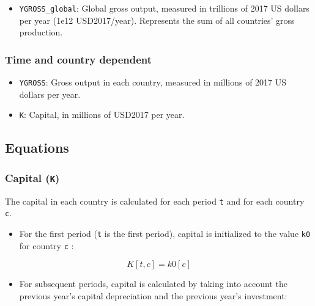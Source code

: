 \documentclass[
]{article}
\providecommand{\tightlist}{%
  \setlength{\itemsep}{0pt}\setlength{\parskip}{0pt}}
\begin{document}
\begin{itemize}
\tightlist
\item
  \texttt{YGROSS\_global}: Global gross output, measured in trillions of
  2017 US dollars per year (1e12 USD2017/year). Represents the sum of all countries'
  gross production.
\end{itemize}

\subsubsection{Time and country
dependent}\label{time-and-country-dependent-7}

\begin{itemize}
\item
  \texttt{YGROSS}: Gross output in each country, measured in millions of
  2017 US dollars per year.
\item
  \texttt{K}: Capital, in millions of USD2017 per year.
\end{itemize}

\subsection{Equations}\label{equations-3}

\subsubsection{\texorpdfstring{Capital
(\texttt{K})}{Capital (K)}}\label{capital-k}

The capital in each country is calculated for each period \texttt{t} and
for each country \texttt{c}.

\begin{itemize}
\tightlist
\item
  For the first period (\texttt{t} is the first period), capital is
  initialized to the value \texttt{k0} for country \texttt{c} :
\end{itemize}

\begin{equation}
 K[t,c] = k0[c]
\end{equation}


\begin{itemize}
\tightlist
\item
  For subsequent periods, capital is calculated by taking into account
  the previous year's capital depreciation and the previous year's
  investment:
\end{itemize}
\end{document}
